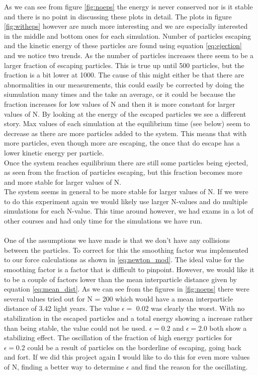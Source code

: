 \documentclass{article}
\begin{document}
As we can see from figure \ref{fig:noeps} the energy is never conserved nor is it stable and there is no point in discussing these plots in detail. The plots in figure \ref{fig:witheps} however are much more interesting and we are especially interested in the middle and bottom ones for each simulation. Number of particles escaping and the kinetic energy of these particles are found using equation \eqref{eq:ejection} and we notice two trends. As the number of particles increases there seem to be a larger fraction of escaping particles. This is true up until 500 particles, but the fraction is a bit lower at 1000. The cause of this might either be that there are abnormalities in our measurements, this could easily be corrected by doing the siumulation many times and the take an average, or it could be because the fraction increases for low values of N and then it is more constant for larger values of N. By looking at the energy of the escaped particles we see a different story. Max values of each simulation at the equilibrium time (see below) seem to decrease as there are more particles added to the system. This means that with more particles, even though more are escaping, the once that do escape has a lower kinetic energy per particle. \\
Once the system reaches equilibrium there are still some particles being ejected, as seen from the fraction of particles escaping, but this fraction becomes more and more stable for larger values of N. \\
The system seems in general to be more stable for larger values of N. If we were to do this experiment again we would likely use larger N-values and do multiple simulations for each N-value. This time around however, we had exams in a lot of other courses and had only time for the simulations we have run.
\\ \\
One of the assumptions we have made is that we don't have any collisions between the particles. To correct for this the smoothing factor was implemented to our force calculations as shown in \eqref{eq:newton_mod}. The ideal value for the smoothing factor is a factor that is difficult to pinpoint. However, we would like it to be a couple of factors lower than the mean interparticle distance given by equation \eqref{eq:mean_dist}. As we can see from the figures in \ref{fig:noeps} there were several values tried out for N = 200 which would have a mean interparticle distance of 3.42 light years. The value $\epsilon = $ 0.02 was clearly the worst. With no stabilization in the escaped particles and a total energy showing a increase rather than being stable, the value could not be used. $\epsilon = 0.2$ and $\epsilon = 2.0$ both show a stabilizing effect. The oscillation of the fraction of high energy particles for $\epsilon = 0.2$ could be a result of particles on the borderline of escaping, going back and fort. If we did this project again I would like to do this for even more values of N, finding a better way to determine $\epsilon$ and find the reason for the oscillating. \\
\end{document}
